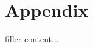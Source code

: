 \documentclass[../../templates/section]{subfiles}
\begin{document}
\section{Appendix}\label{sec:appendix}

filler content...
\end{document}

